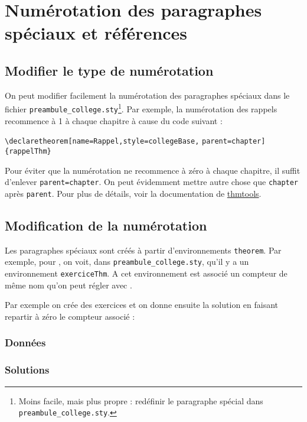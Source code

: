 \section[Numérotation]{Numérotation des paragraphes spéciaux et références}
\label{sec:numerotationParagraphes}


\subsection[Type de numérotation]{Modifier le type de numérotation}

On peut modifier facilement la numérotation des paragraphes spéciaux dans le fichier \texttt{preambule_college.sty}\footnote{Moins facile, mais plus propre : redéfinir le paragraphe spécial dans \texttt{preambule_college.sty}.}. Par exemple, la numérotation des rappels recommence à 1 à chaque chapitre à cause du code suivant :

{\small \Verb!\declaretheorem[name=Rappel,style=collegeBase,!{\color{red} \Verb!parent=chapter!}\Verb!]{rappelThm}!}

Pour éviter que la numérotation ne recommence à zéro à chaque chapitre, il suffit d'enlever \texttt{parent=chapter}. On peut évidemment mettre autre chose que \texttt{chapter} après \texttt{parent}. Pour plus de détails, voir la documentation de \href{http://mirror.ctan.org/macros/latex/exptl/thmtools/thmtools.pdf}{thmtools}.



\subsection{Modification de la numérotation}

Les paragraphes spéciaux sont créés à partir d'environnements \texttt{theorem}. Par exemple, pour \texttt{\exercice}, on voit, dans \texttt{preambule_college.sty}, qu'il y a un environnement \texttt{exerciceThm}. A cet environnement est associé un compteur de même nom qu'on peut régler avec \texttt{\setcounter}.

Par exemple on crée des exercices et on donne ensuite la solution en faisant repartir à zéro le compteur associé :

\begin{LTXexample}[pos=o,width=0.4]
\setcounter{exerciceThm}{8}

\subsubsection{Données}

\setcounter{exerciceThm}{8}

\subsubsection{Solutions}
\end{LTXexample}





